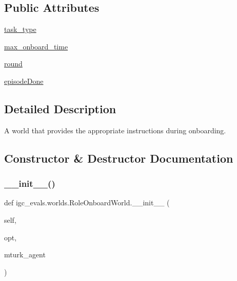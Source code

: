 \subsection*{Public Attributes}
\begin{DoxyCompactItemize}
\item 
\hyperlink{classigc__evals_1_1worlds_1_1RoleOnboardWorld_aa4474e6170fb62445d09455a09377b1c}{task\+\_\+type}
\item 
\hyperlink{classigc__evals_1_1worlds_1_1RoleOnboardWorld_ac1d2cbbaa66cf111ba39cbd112448b99}{max\+\_\+onboard\+\_\+time}
\item 
\hyperlink{classigc__evals_1_1worlds_1_1RoleOnboardWorld_ae6b8b37395e2430f1d533b6fc4cee64e}{round}
\item 
\hyperlink{classigc__evals_1_1worlds_1_1RoleOnboardWorld_a5746dc1a7d35c4a525c8fd2f5f20e149}{episode\+Done}
\end{DoxyCompactItemize}


\subsection{Detailed Description}
\begin{DoxyVerb}A world that provides the appropriate instructions during onboarding.
\end{DoxyVerb}
 

\subsection{Constructor \& Destructor Documentation}
\mbox{\label{classigc__evals_1_1worlds_1_1RoleOnboardWorld_a7842fc40e237a810c8e281c63b176324}} 
\subsubsection{\texorpdfstring{\+\_\+\+\_\+init\+\_\+\+\_\+()}{\_\_init\_\_()}}
{\footnotesize\ttfamily def igc\+\_\+evals.\+worlds.\+Role\+Onboard\+World.\+\_\+\+\_\+init\+\_\+\+\_\+ (\begin{DoxyParamCaption}\item[{}]{self,  }\item[{}]{opt,  }\item[{}]{mturk\+\_\+agent }\end{DoxyParamCaption})}



